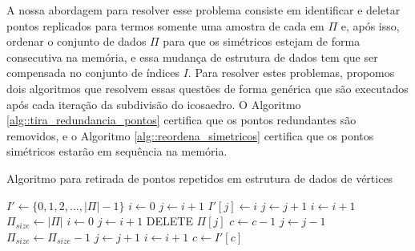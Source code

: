 A nossa abordagem para resolver esse problema consiste em identificar e deletar pontos replicados para termos somente uma amostra de cada em $\Pi$ e, após isso, ordenar o conjunto de dados $\Pi$ para que os simétricos estejam de forma consecutiva na memória, e essa mudança de estrutura de dados tem que ser compensada no conjunto de índices $I$. Para resolver estes problemas, propomos dois algoritmos que resolvem essas questões de forma genérica que são executados após cada iteração da subdivisão do icosaedro. O Algoritmo \ref{alg::tira_redundancia_pontos} certifica que os pontos redundantes são removidos, e o Algoritmo \ref{alg::reordena_simetricos} certifica que os pontos simétricos estarão em sequência na memória.

\begin{algorithm}
\caption{Algoritmo para retirada de pontos repetidos em estrutura de dados de vértices}
\label{alg::tira_redundancia_pontos}
\begin{algorithmic}[1]
 \State $I' \gets \{0, 1, 2, ..., |\Pi| - 1\}$
\State $i \gets 0$
 \label{alg::svs_pt1_inicio}
    \State $j \gets i + 1$
        \If {$\Pi[i] = \Pi[j]$}
            \State $I'[j] \gets i$
        \EndIf
        \State $j \gets j + 1$
    \EndWhile
    \State $i \gets i + 1$
\EndWhile \label{alg::svs_pt1_fim}
\State $\Pi_{size} \gets |\Pi|$
\State $i \gets 0$
 \label{alg::svs_pt2_inicio}
    \State $j \gets i + 1$
        \If{$\Pi[i] = \Pi[j]$}
            \State DELETE $\Pi[j]$ \label{alg::delete}
                \State $c \gets c - 1$
            \EndFor
            \State $j \gets j - 1$
            \State $\Pi_{size} \gets \Pi_{size} - 1$
        \EndIf
        \State $j \gets j + 1$
    \EndWhile
    \State $i \gets i + 1$
\EndWhile \label{alg::svs_pt2_fim}
 \label{alg::resetI}
    \State $c \gets I'[c]$
\EndFor
\EndProcedure
\end{algorithmic}
\end{algorithm}

